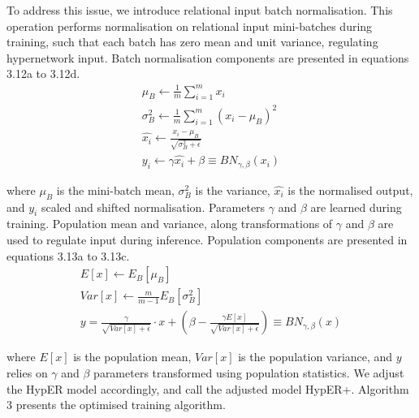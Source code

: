 \noindent To address this issue, we introduce relational input batch normalisation. This operation performs normalisation on relational input mini-batches during training, such that each batch has zero mean and unit variance, regulating hypernetwork input. Batch normalisation components are presented in equations 3.12a to 3.12d. 
\begin{subequations}
	\begin{gather}
		\mu_B \gets \frac{1}{m} \sum_{i=1}^m x_i \\
		\sigma_B^2 \gets \frac{1}{m} \sum_{i=1}^m (x_i - \mu_B)^2 \\
		\hat{x_i} \gets \frac{x_i - \mu_B}{\sqrt{\sigma_B^2 + \epsilon}} \\
		y_i \gets \gamma \hat{x_i} + \beta \equiv BN_{\gamma, \beta}(x_i)
	\end{gather}
\end{subequations}

\noindent where $ \mu_B $ is the mini-batch mean, $ \sigma_B^2 $ is the variance, $ \hat{x_i} $ is the normalised output, and $ y_i $ scaled and shifted normalisation. Parameters $ \gamma $ and $ \beta $ are learned during training. Population mean and variance, along transformations of $ \gamma $ and $ \beta $ are used to regulate input during inference. Population components are presented in equations 3.13a to 3.13c. 
\begin{subequations}
	\begin{gather}
		E[x] \gets E_B[\mu_B] \\
		Var[x] \gets \frac{m}{m - 1} E_B[\sigma_B^2] \\
		y = \frac{\gamma}{\sqrt{Var[x] + \epsilon}} \cdot x + (\beta - \frac{\gamma E[x]}{\sqrt{Var[x] + \epsilon}}) \equiv BN_{\gamma, \beta}(x)
	\end{gather}
\end{subequations}

\noindent where $ E[x] $ is the population mean, $ Var[x] $ is the population variance, and $ y $ relies on  $ \gamma $ and $ \beta $ parameters transformed using population statistics. We adjust the HypER model accordingly, and call the adjusted model HypER+. Algorithm 3 presents the optimised training algorithm. \par

